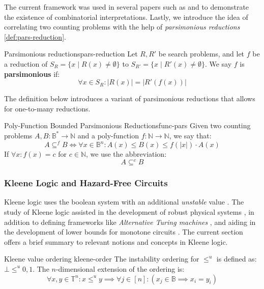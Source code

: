 The current framework was used in several papers such as
\cite{ikenmeyer_WhatWhatNot_2022} and \cite{ikenmeyer_PositivitySymmetricGroup_2024}
to demonstrate the existence of combinatorial interpretations.
Lastly, we introduce the idea of correlating two counting problems with the help of
\textit{parsimonious reductions} \ref{def:pars-reduction}.


\begin{definitionbox}{Parsimonious reductions}{pars-reduction}
	Let $R, R'$ be search problems, and let $f$ be a reduction of
	$S_R = \{x \mid R(x) \neq \emptyset \}$ to $S_{R'} = \{x \mid R'(x) \neq \emptyset \}$.
	We say $f$ is \textbf{parsimonious} if:
	$$
		\forall x \in S_R : |R(x)| = |R'(f(x))|
	$$
\end{definitionbox}

The definition below introduces a variant of parsimonious reductions that allows
for one-to-many reductions.
\begin{definitionbox}{Poly-Function Bounded Parsimonious Reductions}{func-pars}
	Given two counting problems $A, B : \mathbb{B}^* \to \mathbb{N}$
	and a poly-function $f : \mathbb{N} \to \mathbb{N}$, we
	say that:
	$$
		A \subseteq^f B \iff \forall x \in \mathbb{B}^n:  A(x) \leq B(x) \leq f(|x|) \cdot A(x)
	$$
	If $\forall x : f(x) = c$ for $c \in \mathbb{N}$, we use the abbreviation:
	$$
		A \subseteq^c B
	$$
\end{definitionbox}


\subsubsection{Kleene Logic and Hazard-Free Circuits}

Kleene logic uses the boolean system with an additional \textit{unstable} value \cite{kleene_IntroductionMetamathematics_2009}.
The study of Kleene logic assisted in
the development of robust physical systems \cite{friedrichs_MetastabilityContainingCircuits_2018}, in addition to defining frameworks like \textit{Alternative Turing machines} \cite{kozen_TheoryComputation_2006}, and
aiding in the development of lower bounds for monotone circuits
\cite{eichelberger_HazardDetectionCombinational_1965, ikenmeyer_ComplexityHazardfreeCircuits_2019,ikenmeyer_KarchmerWigdersonGamesHazardfree_2022,  bund_SmallHazardFreeTransducers_2025}.
The current section offers a brief summary to relevant notions and concepts in Kleene logic.

\begin{definitionbox}{Kleene value ordering \cite{mukaidono_BternaryLogicFunction_1972}}{kleene-order}
	The instability ordering for $\leq^u$ is defined as: $\bot \leq^u 0,1$. The $n$-dimensional
	extension of the ordering is:
	$$
		\forall x,y \in \mathbb{T}^n: x \leq^u y \implies \forall j \in [n]: (x_j \in \mathbb{B} \implies x_i = y_i)
	$$
\end{definitionbox}



